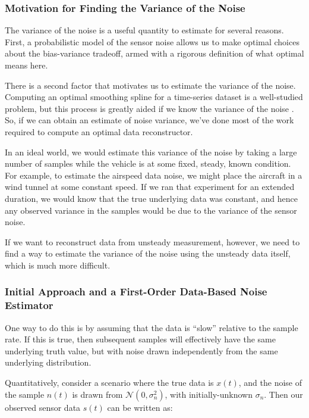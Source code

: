 \documentclass[conf]{new-aiaa}
\begin{document}
    \subsubsection{Motivation for Finding the Variance of the Noise}

    The variance of the noise is a useful quantity to estimate for several reasons. First, a probabilistic model of the sensor noise allows us to make optimal choices about the bias-variance tradeoff, armed with a rigorous definition of what optimal means here.

    There is a second factor that motivates us to estimate the variance of the noise. Computing an optimal smoothing spline for a time-series dataset is a well-studied problem, but this process is greatly aided if we know the variance of the noise \cite{wahba}. So, if we can obtain an estimate of noise variance, we've done most of the work required to compute an optimal data reconstructor.

    In an ideal world, we would estimate this variance of the noise by taking a large number of samples while the vehicle is at some fixed, steady, known condition. For example, to estimate the airspeed data noise, we might place the aircraft in a wind tunnel at some constant speed. If we ran that experiment for an extended duration, we would know that the true underlying data was constant, and hence any observed variance in the samples would be due to the variance of the sensor noise.

    If we want to reconstruct data from unsteady measurement, however, we need to find a way to estimate the variance of the noise using the unsteady data itself, which is much more difficult.

    \subsubsection{Initial Approach and a First-Order Data-Based Noise Estimator}

    One way to do this is by assuming that the data is ``slow'' relative to the sample rate. If this is true, then subsequent samples will effectively have the same underlying truth value, but with noise drawn independently from the same underlying distribution.

    Quantitatively, consider a scenario where the true data is $x(t)$, and the noise of the sample $n(t)$ is drawn from $\mathcal{N}(0, \sigma^2_n)$, with initially-unknown $\sigma_n$. Then our observed sensor data $s(t)$ can be written as:
\end{document}
